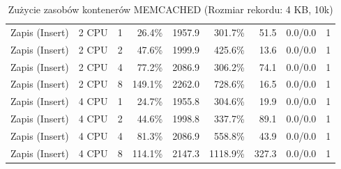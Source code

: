 \begin{table}[ht]
{\begin{tabular}{llcrrrrcc}
Zapis (Insert) & 2 CPU & 1 & 26.4\% & 1957.9 & 301.7\% & 51.5 & 0.0/0.0 & 1 \\
Zapis (Insert) & 2 CPU & 2 & 47.6\% & 1999.9 & 425.6\% & 13.6 & 0.0/0.0 & 1 \\
Zapis (Insert) & 2 CPU & 4 & 77.2\% & 2086.9 & 306.2\% & 74.1 & 0.0/0.0 & 1 \\
Zapis (Insert) & 2 CPU & 8 & 149.1\% & 2262.0 & 728.6\% & 16.5 & 0.0/0.0 & 1 \\
Zapis (Insert) & 4 CPU & 1 & 24.7\% & 1955.8 & 304.6\% & 19.9 & 0.0/0.0 & 1 \\
Zapis (Insert) & 4 CPU & 2 & 44.6\% & 1998.8 & 337.7\% & 89.1 & 0.0/0.0 & 1 \\
Zapis (Insert) & 4 CPU & 4 & 81.3\% & 2086.9 & 558.8\% & 43.9 & 0.0/0.0 & 1 \\
Zapis (Insert) & 4 CPU & 8 & 114.1\% & 2147.3 & 1118.9\% & 327.3 & 0.0/0.0 & 1 \\
\bottomrule
\end{tabular}%
}
\caption{Zużycie zasobów kontenerów MEMCACHED (Rozmiar rekordu: 4 KB, 10k)}
\label{tab:resources_memcached_medium_10000}
\end{table}
